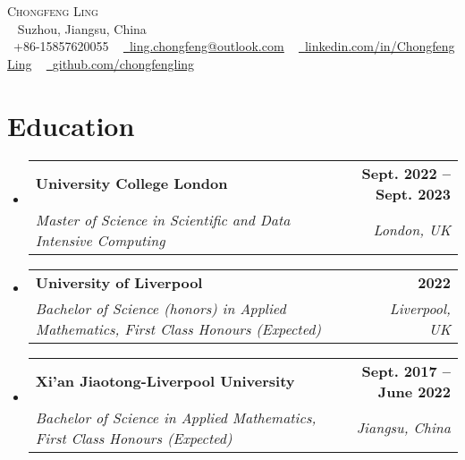 \documentclass[letterpaper,11pt]{article}
\makeatletter
\newcommand{\resumeSubheading}[4]{
  \vspace{-2pt}\item
    \begin{tabular*}{1.0\textwidth}[t]{l@{\extracolsep{\fill}}r}
      \textbf{#1} & \textbf{\small #2} \\
      \textit{\small#3} & \textit{\small #4} \\
    \end{tabular*}\vspace{-7pt}
}
\newcommand{\resumeSubHeadingListStart}{\begin{itemize}[leftmargin=0.0in, label={}]}
\newcommand{\resumeSubHeadingListEnd}{\end{itemize}}
\makeatother
\begin{document}

\begin{center}
    {\Huge \scshape Chongfeng Ling} \\ \vspace{1pt} ~
    Suzhou, Jiangsu, China \\ \vspace{1pt}
    \small \raisebox{-0.1\height}\faPhone\ +86-15857620055 ~ \href{mailto:ling.chongfeng@outlook.com}{\raisebox{-0.2\height}\faEnvelope\  \underline{ling.chongfeng@outlook.com}} ~ 
    \href{https://www.linkedin.com/in/chongfeng-ling-6129561a7/}{\raisebox{-0.2\height}\faLinkedin\ \underline{linkedin.com/in/Chongfeng Ling}}  ~
    \href{https://github.com/chongfengling}{\raisebox{-0.2\height}\faGithub\ \underline{github.com/chongfengling}}
    \vspace{-8pt}
\end{center}


\section{Education}
  \resumeSubHeadingListStart

    \resumeSubheading
      {University College London}{Sept. 2022 -- Sept. 2023}
      {Master of Science in Scientific and Data Intensive Computing}{London, UK}
       
    \resumeSubheading
      {University of Liverpool}{2022}
      {Bachelor of Science (honors) in Applied Mathematics, First Class Honours (Expected)}{Liverpool, UK}
      
    \resumeSubheading
      {Xi'an Jiaotong-Liverpool University}{Sept. 2017 -- June 2022}
      {Bachelor of Science in Applied Mathematics, First Class Honours (Expected)}{Jiangsu, China}

  \resumeSubHeadingListEnd

\end{document}
